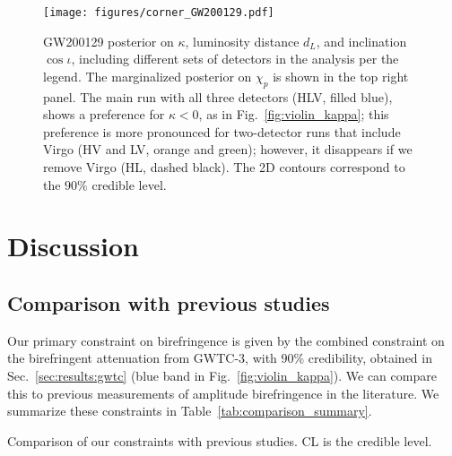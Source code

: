 \documentclass[aps,prd,twocolumn,superscriptaddress,preprintnumbers,nofootinbib]{revtex4-2}
\begin{document}
\begin{figure}
    \texttt{[image: figures/corner\_GW200129.pdf]}
    \caption{
        GW200129 posterior on $\kappa$, luminosity distance $d_L$, and inclination $\cos{\iota}$, including different sets of detectors in the analysis per the legend.
        The marginalized posterior on $\chi_p$ is shown in the top right panel.
        The main run with all three detectors (HLV, filled blue), shows a preference for $\kappa < 0$, as in Fig.~\ref{fig:violin_kappa}; this preference is more pronounced for two-detector runs that include Virgo (HV and LV, orange and green); however, it disappears if we remove Virgo (HL, dashed black).
        The \ac{2D} contours correspond to the $90\%$ credible level.
    }
    \label{fig:corner_GW200129}
\end{figure}

\section{Discussion}
\label{sec:Discussion}

\subsection{Comparison with previous studies}

Our primary constraint on birefringence is given by the combined constraint on the birefringent attenuation from GWTC-3, with 90\% credibility, obtained in Sec.~\ref{sec:results:gwtc} (blue band in Fig.~\ref{fig:violin_kappa}).
We can compare this to previous measurements of amplitude birefringence in the literature.
We summarize these constraints in Table~\ref{tab:comparison_summary}.

\begin{table}
    \caption{
        Comparison of our constraints with previous studies.
        CL is the credible level.
    }
    \begin{ruledtabular}
    \end{ruledtabular}
    \label{tab:comparison_summary}
\end{table}
\end{document}
